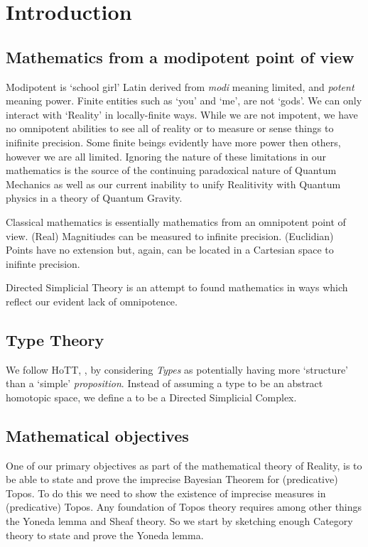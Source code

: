 \documentclass[a4paper,openany]{amsbook}
\begin{document}
\chapter{Introduction}

\section{Mathematics from a modipotent point of view}

Modipotent is `school girl' Latin derived from \emph{modi} meaning limited, and
\emph{potent} meaning power. Finite entities such as `you' and `me', are not
`gods'. We can only interact with `Reality' in locally-finite ways. While we are
not impotent, we have no omnipotent abilities to see all of reality or to
measure or sense things to inifinite precision. Some finite beings evidently
have more power then others, however we are all limited. Ignoring the nature of
these limitations in our mathematics is the source of the continuing paradoxical
nature of Quantum Mechanics as well as our current inability to unify
Realitivity with Quantum physics in a theory of Quantum Gravity.

Classical mathematics is essentially mathematics from an omnipotent point of
view. (Real) Magnitiudes can be measured to infinite precision. (Euclidian)
Points have no extension but, again, can be located in a Cartesian space to
inifinte precision.

Directed Simplicial Theory is an attempt to found mathematics in ways which
reflect our evident lack of omnipotence. 

\section{Type Theory}

We follow HoTT, \cite{HoTT}, by considering \emph{Types} as potentially having
more `structure' than a `simple' \emph{proposition}.  Instead of assuming a
type to be an abstract homotopic space, we define a  to be a Directed Simplicial Complex.

\section{Mathematical objectives}

One of our primary objectives as part of the mathematical theory of Reality, is
to be able to state and prove the imprecise Bayesian Theorem for
(predicative) Topos.  To do this we need to show the existence of imprecise
measures in (predicative) Topos. Any foundation of Topos theory requires among
other things the Yoneda lemma and Sheaf theory. So we start by sketching enough
Category theory to state and prove the Yoneda lemma.
\end{document}
